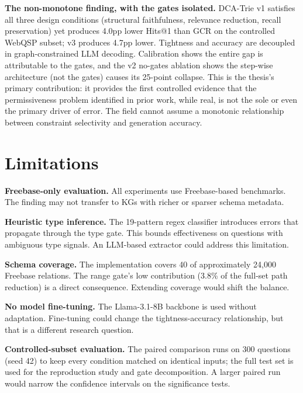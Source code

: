 \textbf{The non-monotone finding, with the gates isolated.} DCA-Trie v1 satisfies all three design conditions (structural faithfulness, relevance reduction, recall preservation) yet produces 4.0pp lower Hits@1 than GCR on the controlled WebQSP subset; v3 produces 4.7pp lower. Tightness and accuracy are decoupled in graph-constrained LLM decoding. Calibration shows the entire gap is attributable to the gates, and the v2 no-gates ablation shows the step-wise architecture (not the gates) causes its 25-point collapse. This is the thesis's primary contribution: it provides the first controlled evidence that the permissiveness problem identified in prior work, while real, is not the sole or even the primary driver of error. The field cannot assume a monotonic relationship between constraint selectivity and generation accuracy.

\section{Limitations}
\label{sec:ch5limitations}

\textbf{Freebase-only evaluation.} All experiments use Freebase-based benchmarks. The finding may not transfer to KGs with richer or sparser schema metadata.

\textbf{Heuristic type inference.} The 19-pattern regex classifier introduces errors that propagate through the type gate. This bounds effectiveness on questions with ambiguous type signals. An LLM-based extractor could address this limitation.

\textbf{Schema coverage.} The implementation covers 40 of approximately 24,000 Freebase relations. The range gate's low contribution (3.8\% of the full-set path reduction) is a direct consequence. Extending coverage would shift the balance.

\textbf{No model fine-tuning.} The Llama-3.1-8B backbone is used without adaptation. Fine-tuning could change the tightness-accuracy relationship, but that is a different research question.

\textbf{Controlled-subset evaluation.} The paired comparison runs on 300 questions (seed 42) to keep every condition matched on identical inputs; the full test set is used for the reproduction study and gate decomposition. A larger paired run would narrow the confidence intervals on the significance tests.

